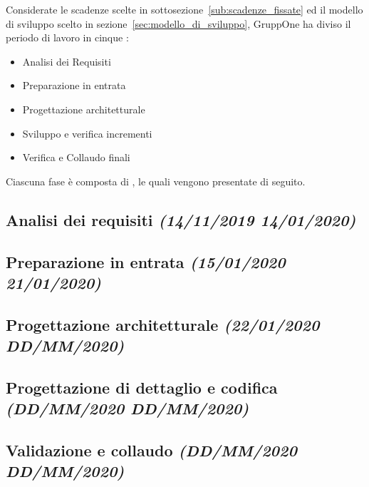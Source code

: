 \documentclass[../piano-di-progetto.tex]{subfiles}
\begin{document}
Considerate le scadenze scelte in sottosezione~\ref{sub:scadenze_fissate} ed il modello di sviluppo scelto in sezione~\ref{sec:modello_di_sviluppo}, GruppOne ha diviso il periodo di lavoro in cinque :
\begin{itemize}
  \item Analisi dei Requisiti
  \item Preparazione in entrata
  \item Progettazione architetturale
  \item Sviluppo e verifica incrementi
  \item Verifica e Collaudo finali
\end{itemize}
Ciascuna fase è composta di , le quali vengono presentate di seguito.
\subsection[Analisi dei requisiti]{Analisi dei requisiti {\normalsize\normalfont\itshape(14/11/2019  14/01/2020)}}%
\label{sub:analisi_de/i_requisiti}

\subsection[Preparazione in entrata]{Preparazione in entrata {\normalsize\normalfont\itshape(15/01/2020  21/01/2020)}}%
\label{sub:preparazione_in_entrata}

\subsection[Progettazione architetturale]{Progettazione architetturale {\normalsize\normalfont\itshape(22/01/2020  DD/MM/2020)}}%
\label{sub:progettazione_architetturale}

\subsection[Progettazione di dettaglio e codifica]{Progettazione di dettaglio e codifica {\normalsize\normalfont\itshape(DD/MM/2020  DD/MM/2020)}}%
\label{sub:progettazione_dettaglio_codifica}

\subsection[Validazione e collaudo]{Validazione e collaudo {\normalsize\normalfont\itshape(DD/MM/2020  DD/MM/2020)}}%
\label{sub:validazione_e_collaudo}

\end{document}
